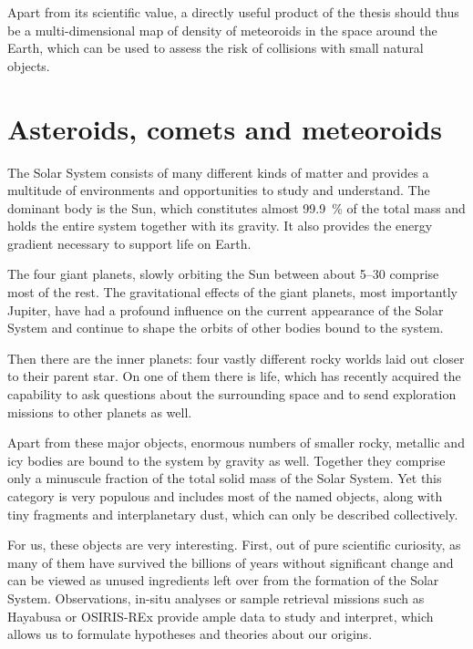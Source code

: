    Apart from its scientific value, a directly useful product of the thesis should thus
    be a multi-dimensional map of density of meteoroids in the space around the Earth,
    which can be used to assess the risk of collisions with small natural objects.

\section{Asteroids, comets and meteoroids} \label{ia}
    The Solar System consists of many different kinds of matter and provides a multitude
    of environments and opportunities to study and understand.
    The dominant body is the Sun, which constitutes almost \SI{99.9}{\percent} of the total mass
    and holds the entire system together with its gravity.
    It also provides the energy gradient necessary to support life on Earth.

    The four giant planets, slowly orbiting the Sun between about \SIrange[range-phrase = {\ and\ }]{5}{30}{\au}
    comprise most of the rest. The gravitational effects of the giant planets, most importantly Jupiter,
    have had a profound influence on the current appearance of the Solar System and continue to
    shape the orbits of other bodies bound to the system.

    Then there are the inner planets: four vastly different rocky worlds laid out closer to their parent star.
    On one of them there is life, which has recently acquired the capability to ask questions about the surrounding
    space and to send exploration missions to other planets as well.

    Apart from these major objects, enormous numbers of smaller rocky, metallic and icy
    bodies are bound to the system by gravity as well. Together they comprise only a minuscule
    fraction of the total solid mass of the Solar System. Yet this category is very populous
    and includes most of the named objects, along with tiny fragments and interplanetary dust,
    which can only be described collectively.

    For us, these objects are very interesting. First, out of pure scientific curiosity, as many of them
    have survived the billions of years without significant change and can be viewed
    as unused ingredients left over from the formation of the Solar System.
    Observations, in-situ analyses or sample retrieval missions such as Hayabusa or OSIRIS-REx
    provide ample data to study and interpret, which allows us to formulate hypotheses and theories about our origins.

